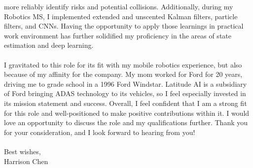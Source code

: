 \documentclass{coverletter}
\begin{document}
more reliably identify risks and potential collisions. Additionally, during my Robotics MS, I
implemented extended and unscented Kalman filters, particle filters, and CNNs. Having the
opportunity to apply those learnings in practical work environment has further solidified my
proficiency in the areas of state estimation and deep learning. \\~\\
I gravitated to this role for its fit with my mobile robotics experience, but also because of my
affinity for the company. My mom worked for Ford for 20 years, driving me to grade school in a 1996
Ford Windstar. Latitude AI is a subsidiary of Ford bringing ADAS technology to its vehicles, so I
feel especially invested in its mission statement and success. Overall, I feel confident that I am
a strong fit for this role and well-positioned to make positive contributions within it. I would
love an opportunity to discuss the role and my qualifications further. Thank you for your
consideration, and I look forward to hearing from you! \\~\\ Best wishes, \\ Harrison Chen
\end{document}
